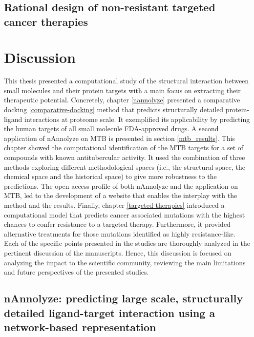 \documentclass[12pt, b5paper,twoside]{tesi_upf}
\begin{document}
\par 


\subsection{Rational design of non-resistant targeted cancer therapies}\label{blending}


\section{Discussion}\label{discussion}

\par This thesis presented a computational study of the structural interaction between small molecules and their protein targets with a main focus on extracting their therapeutic potential. Concretely, chapter \ref{nannolyze} presented a comparative docking \ref{comparative-docking} method that predicts structurally detailed protein-ligand interactions at proteome scale. It exemplified its applicability by predicting the human targets of all small molecule FDA-approved drugs. A second application of nAnnolyze on MTB is presented in section \ref{mtb_results}. This chapter showed the computational identification of the MTB targets for a set of compounds with known antitubercular activity. It used the combination of three methods exploring different methodological spaces (i.e., the structural space, the chemical space and the historical space) to give more robustness to the predictions. The open access profile of both nAnnolyze and the application on MTB, led to the development of a website that enables the interplay with the method and the results. Finally, chapter \ref{targeted therapies} introduced a computational model that predicts cancer associated mutations with the highest chances to confer resistance to a targeted therapy. Furthermore, it provided alternative treatments for those mutations identified as highly resistance-like. Each of the specific points presented in the studies are thoroughly analyzed in the pertinent discussion of the manuscripts. Hence, this discussion is focused on analyzing the impact to the scientific community, reviewing the main limitations and future perspectives of the presented studies.

 \subsection{nAnnolyze: predicting large scale, structurally detailed ligand-target interaction using a network-based representation}
 
\end{document}
